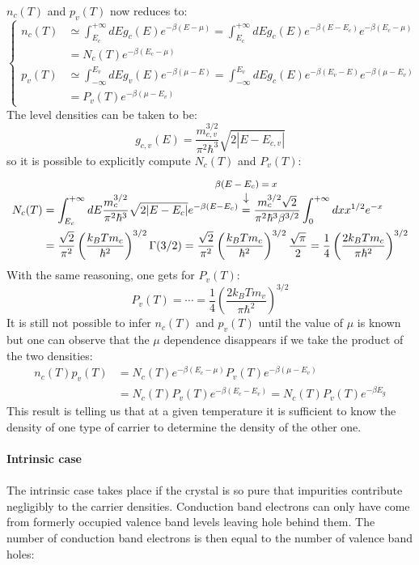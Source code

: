 \documentclass[10.75pt,a4paper,openright,bottom=2cm]{article}
\begin{document}
$n_c(T)$ and $p_v(T)$ now reduces to:
\begin{equation}
\label{ncpv}
\left\{
\begin{aligned}
n_c(T)&\simeq\int_{E_c}^{+\infty} dEg_c(E)e^{-\beta(E-\mu)}=\int_{E_c}^{+\infty} dEg_c(E)e^{-\beta(E-E_c)}e^{-\beta(E_c-\mu)}\\
&=N_c(T)e^{-\beta(E_c-\mu)}\\
p_v(T)&\simeq\int_{-\infty}^{E_v} dEg_v(E)e^{-\beta(\mu-E)}=\int_{-\infty}^{E_v} dEg_c(E)e^{-\beta(E_v-E)}e^{-\beta(\mu-E_v)}\\
&=P_v(T)e^{-\beta(\mu-E_v)}
\end{aligned}
\right.
\end{equation}
The level densities can be taken to be:
\[
g_{c,v}(E)=\frac{m_{c,v}^{3/2}}{\pi^2\hbar^3}\sqrt{2|E-E_{c,v}|}
\]
so it is possible to explicitly compute $N_c(T)$ and $P_v(T)$:
\begin{align*}
N_c(T)&=\int_{E_c}^{+\infty} dE\frac{m_c^{3/2}}{\pi^2\hbar^3}\sqrt{2|E-E_c|}e^{-\beta(E-E_c)}\overset{\mathclap{\tikz \node {$\downarrow$} node [above=1ex] {\footnotesize $\beta(E-E_c)=x$ };}}
{=}\frac{m_c^{3/2}\sqrt{2}}{\pi^2\hbar^3\beta^{3/2}}\int_0^{+\infty}dxx^{1/2}e^{-x}\\
&=\frac{\sqrt{2}}{\pi^2}\left(\frac{k_BTm_c}{\hbar^2}\right)^{3/2}\Gamma(3/2)=\frac{\sqrt{2}}{\pi^2}\left(\frac{k_BTm_c}{\hbar^2}\right)^{3/2}\frac{\sqrt{\pi}}{2}=\frac{1}{4}\left(\frac{2k_BTm_c}{\pi\hbar^2}\right)^{3/2}
\end{align*}
With the same reasoning, one gets for $P_v(T)$:
\[
P_v(T)=\cdots=\frac{1}{4}\left(\frac{2k_BTm_v}{\pi\hbar^2}\right)^{3/2}
\]
It is still not possible to infer $n_c(T)$ and $p_v(T)$ until the value of $\mu$ is known but one can observe that the $\mu$ dependence disappears if we take the product of the two densities:
\begin{align*}
n_c(T)p_v(T)&=N_c(T)e^{-\beta(E_c-\mu)}P_v(T)e^{-\beta(\mu-E_v)}\\
&=N_c(T)P_v(T)e^{-\beta(E_c-E_v)}=N_c(T)P_v(T)e^{-\beta E_g}
\end{align*}
This result is telling us that at a given temperature it is sufficient to know the density of one type of carrier to determine the density of the other one.\\\\
\textbf{Intrinsic case}\\\\
The intrinsic case takes place if the crystal is so pure that impurities contribute negligibly to the carrier densities. Conduction band electrons can only have come from formerly occupied valence band levels leaving hole behind them. The number of conduction band electrons is then equal to the number of valence band holes:
\end{document}
